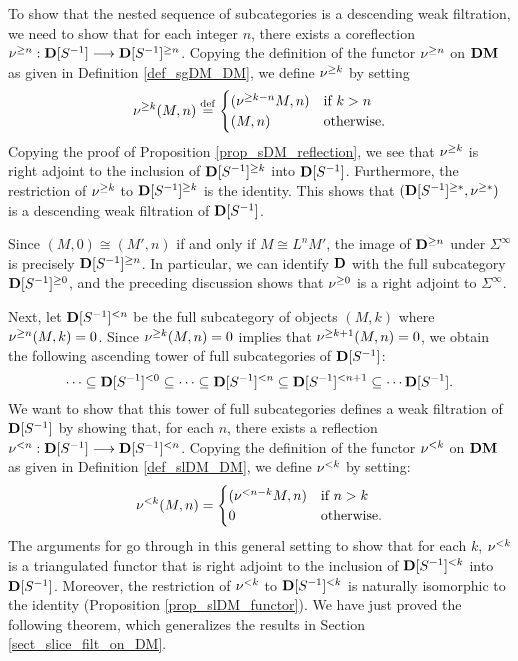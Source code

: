 To show that the nested sequence of subcategories is a descending 
weak filtration, we need to show that for each integer $n$, there 
exists a coreflection $\preradD{n}: \DCatLoc{S} \to 
\Prerad{n}{\DCatLoc{S}}$. Copying the definition of the functor 
$\preradD{n}$ on $\DM$ as given in Definition \ref{def_sgDM_DM}, 
we define $\preradD{k}$ by setting
\[
\preradD{k}(M, n) \defeq \begin{cases}
(\preradD{k - n}M, n) &\textrm{if }k > n\\
(M, n) &\textrm{otherwise}.
\end{cases}
\]
Copying the proof of Proposition \ref{prop_sDM_reflection}, we
see that $\preradD{k}$ is right adjoint to the inclusion of
$\Prerad{k}{\DCatLoc{S}}$ into $\DCatLoc{S}$. Furthermore,
the restriction of $\preradD{k}$ to $\Prerad{k}{\DCatLoc{S}}$
is the identity. This shows that $(\Prerad{*}{\DCatLoc{S}},
\preradD{*})$ is a descending weak filtration of $\DCatLoc{S}$.

\begin{rmk}
Since $(M, 0) \cong (M', n)$ if and only if $M \cong L^nM'$, the 
image of $\Prerad{n}{\DCat}$ under $\Sigma^\infty$ is precisely
$\Prerad{n}{\DCatLoc{S}}$. In particular, we can identify $\DCat$
with the full subcategory $\Prerad{0}{\DCatLoc{S}}$, and the 
preceding discussion shows that $\preradD{0}$ is a right
adjoint to $\Sigma^\infty$.
\end{rmk}

Next, let $\Corad{n}{\DCatLoc{S}}$ be the full subcategory of
objects $(M, k)$ where $\preradD{n}(M, k) = 0$. Since 
$\preradD{k}(M, n) = 0$ implies that $\preradD{k + 1}(M, n) = 0$,
we obtain the following ascending tower of full subcategories of
$\DCatLoc{S}$:
\[
\cdots \subseteq \Corad{0}{\DCatLoc{S}} \subseteq \cdots \subseteq 
   \Corad{n}{\DCatLoc{S}} \subseteq \Corad{n + 1}{\DCatLoc{S}}
   \subseteq \cdots \DCatLoc{S}.
\]
We want to show that this tower of full subcategories defines
a weak filtration of $\DCatLoc{S}$ by showing that, for each $n$,
there exists a reflection $\coradD{n}: \DCatLoc{S} \to 
\Corad{n}{\DCatLoc{S}}$. Copying the definition of the functor
$\coradD{k}$ on $\DM$ as given in Definition \ref{def_slDM_DM},
we define $\coradD{k}$ by setting:
\[
\coradD{k}(M, n) = \begin{cases}
(\coradD{n - k}M, n) &\textrm{if }n > k\\
0                    &\textrm{otherwise}.
\end{cases}
\]
The arguments for \cite[1.3(i)]{HuKa} go through
in this general setting to show that for each $k$, $\coradD{k}$ is 
a triangulated functor that is right adjoint to the inclusion of 
$\Corad{k}{\DCatLoc{S}}$ into $\DCatLoc{S}$. Moreover, the 
restriction of $\coradD{k}$ to $\Corad{k}{\DCatLoc{S}}$ is 
naturally isomorphic to the identity (\CF Proposition 
\ref{prop_slDM_functor}). We have just proved the following
theorem, which generalizes the results in Section 
\ref{sect_slice_filt_on_DM}. 

